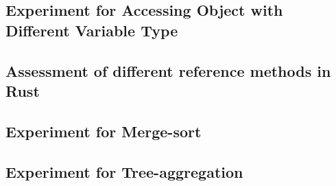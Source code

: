 
\subsection{Experiment for Accessing Object with Different Variable Type}
\label{sec:history}

\clearpage

\subsection{Assessment of different reference methods in Rust}
\label{sec:history}

\clearpage

\subsection{Experiment for Merge-sort}
\label{sec:history}

\clearpage

\subsection{Experiment for Tree-aggregation}
\label{sec:history}

\clearpage

% 
